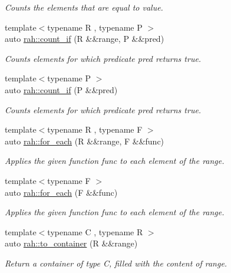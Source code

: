 \begin{DoxyCompactItemize}
\begin{DoxyCompactList}\small\item\em Counts the elements that are equal to value. \end{DoxyCompactList}\item 
{\footnotesize template$<$typename R , typename P $>$ }\\auto \mbox{\hyperlink{namespacerah_a8e6a379c05d482a52137f5647783fe27}{rah\+::count\+\_\+if}} (R \&\&range, P \&\&pred)
\begin{DoxyCompactList}\small\item\em Counts elements for which predicate pred returns true. \end{DoxyCompactList}\item 
{\footnotesize template$<$typename P $>$ }\\auto \mbox{\hyperlink{namespacerah_a9e22b56a1f28a353659fed572f33f5a9}{rah\+::count\+\_\+if}} (P \&\&pred)
\begin{DoxyCompactList}\small\item\em Counts elements for which predicate pred returns true. \end{DoxyCompactList}\item 
{\footnotesize template$<$typename R , typename F $>$ }\\auto \mbox{\hyperlink{namespacerah_afd971bc9f9c098df8422e221adfb199f}{rah\+::for\+\_\+each}} (R \&\&range, F \&\&func)
\begin{DoxyCompactList}\small\item\em Applies the given function func to each element of the range. \end{DoxyCompactList}\item 
{\footnotesize template$<$typename F $>$ }\\auto \mbox{\hyperlink{namespacerah_a76e2ce1a497aa3726cc9d99fb320ac67}{rah\+::for\+\_\+each}} (F \&\&func)
\begin{DoxyCompactList}\small\item\em Applies the given function func to each element of the range. \end{DoxyCompactList}\item 
{\footnotesize template$<$typename C , typename R $>$ }\\auto \mbox{\hyperlink{namespacerah_a11fcae12055a2bcf5ac7c41e25e74a32}{rah\+::to\+\_\+container}} (R \&\&range)
\begin{DoxyCompactList}\small\item\em Return a container of type C, filled with the content of range. \end{DoxyCompactList}\item 

\end{DoxyCompactItemize}
